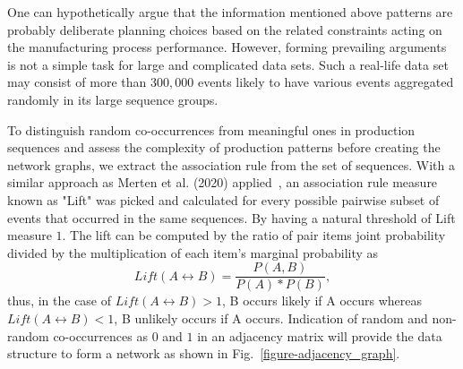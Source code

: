 One can hypothetically argue that the information mentioned above patterns are probably deliberate planning choices based on the related constraints acting on the manufacturing process performance. However, forming prevailing arguments is not a simple task for large and complicated data sets. Such a real-life data set may consist of more than $300,000$ events likely to have various events aggregated randomly in its large sequence groups.

To distinguish random co-occurrences from meaningful ones in production sequences and assess the complexity of production patterns before creating the network graphs, we extract the association rule from the set of sequences. With a similar approach as Merten et al. (2020) applied~\cite{MERTEN2020}, an association rule measure known as "Lift" was picked and calculated for every possible pairwise subset of events that occurred in the same sequences. By having a natural threshold of Lift measure $1$. The lift can be computed by the ratio of pair items joint probability divided by the multiplication of each item's marginal probability as
\begin{equation} \tag{6}
	Lift(A\leftrightarrow B)=\frac{P(A,B)}{P(A)*P(B)},
	\label{lift}
\end{equation}
thus, in the case of $Lift(A\leftrightarrow B)> 1$, B occurs likely if A occurs whereas $Lift(A\leftrightarrow B)< 1$, B unlikely occurs if A occurs. Indication of random and non-random co-occurrences as $0$ and $1$ in an adjacency matrix will provide the data structure to form a network as shown in Fig.~\ref{figure-adjacency_graph}.

